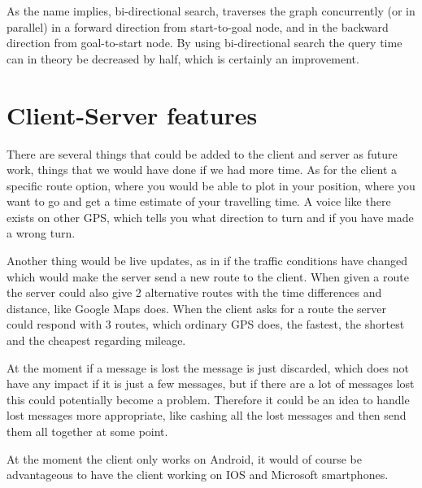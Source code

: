 As the name implies, bi-directional search, traverses the graph concurrently (or in parallel) in a forward direction from start-to-goal node, and in the backward direction from goal-to-start node. By using bi-directional search the query time can in theory be decreased by half, which is certainly an improvement.

\section{Client-Server features}
There are several things that could be added to the client and server as future work, things that we would have done if we had more time.
As for the client a specific route option, where you would be able to plot in your position, where you want to go and get a time estimate of your travelling time. A voice like there exists on other GPS, which tells you what direction to turn and if you have made a wrong turn.

Another thing would be live updates, as in if the traffic conditions have changed which would make the server send a new route to the client. When given a route the server could also give 2 alternative routes with the time differences and distance, like Google Maps does.
When the client asks for a route the server could respond with 3 routes, which ordinary GPS does, the fastest, the shortest and the cheapest regarding  mileage.

At the moment if a message is lost the message is just discarded, which does not have any impact if it is just a few messages, but if there are a lot of messages lost this could potentially become a problem. Therefore it could be an idea to handle lost messages more appropriate, like cashing all the lost messages and then send them all together at some point.

At the moment the client only works on Android, it would of course be advantageous to have the client working on IOS and Microsoft smartphones.
